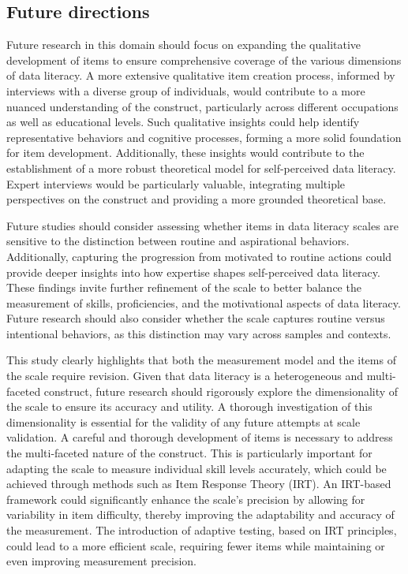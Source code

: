 \documentclass[
  12pt,
  a4paper,
  twoside]{article}
\begin{document}
\subsection{Future directions}\label{future-directions}

Future research in this domain should focus on expanding the qualitative development of items to ensure comprehensive coverage of the various dimensions of data literacy. A more extensive qualitative item creation process, informed by interviews with a diverse group of individuals, would contribute to a more nuanced understanding of the construct, particularly across different occupations as well as educational levels. Such qualitative insights could help identify representative behaviors and cognitive processes, forming a more solid foundation for item development. Additionally, these insights would contribute to the establishment of a more robust theoretical model for self-perceived data literacy. Expert interviews would be particularly valuable, integrating multiple perspectives on the construct and providing a more grounded theoretical base.

Future studies should consider assessing whether items in data literacy scales are sensitive to the distinction between routine and aspirational behaviors. Additionally, capturing the progression from motivated to routine actions could provide deeper insights into how expertise shapes self-perceived data literacy.
These findings invite further refinement of the scale to better balance the measurement of skills, proficiencies, and the motivational aspects of data literacy.
Future research should also consider whether the scale captures routine versus intentional behaviors, as this distinction may vary across samples and contexts.

This study clearly highlights that both the measurement model and the items of the scale require revision. Given that data literacy is a heterogeneous and multi-faceted construct, future research should rigorously explore the dimensionality of the scale to ensure its accuracy and utility. A thorough investigation of this dimensionality is essential for the validity of any future attempts at scale validation.
A careful and thorough development of items is necessary to address the multi-faceted nature of the construct. This is particularly important for adapting the scale to measure individual skill levels accurately, which could be achieved through methods such as Item Response Theory (IRT). An IRT-based framework could significantly enhance the scale's precision by allowing for variability in item difficulty, thereby improving the adaptability and accuracy of the measurement. The introduction of adaptive testing, based on IRT principles, could lead to a more efficient scale, requiring fewer items while maintaining or even improving measurement precision.
\end{document}
